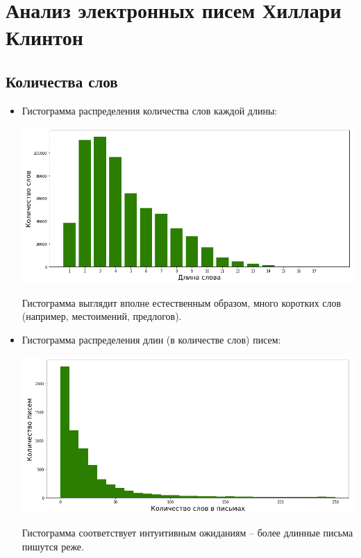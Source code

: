 \section{Анализ электронных писем Хиллари Клинтон}

\subsection{Количества слов}

\begin{itemize}

\item Гистограмма распределения количества слов каждой длины: 

\includegraphics[scale=0.5]{pics/word_lengths.png}

Гистограмма выглядит вполне естественным образом, много коротких слов (например, местоимений, предлогов).

\item Гистограмма распределения длин (в количестве слов) писем:

\includegraphics[scale=0.5]{pics/email_lengths.png}

Гистограмма соответствует интуитивным ожиданиям -- более длинные письма пишутся реже. 
\end{itemize}

